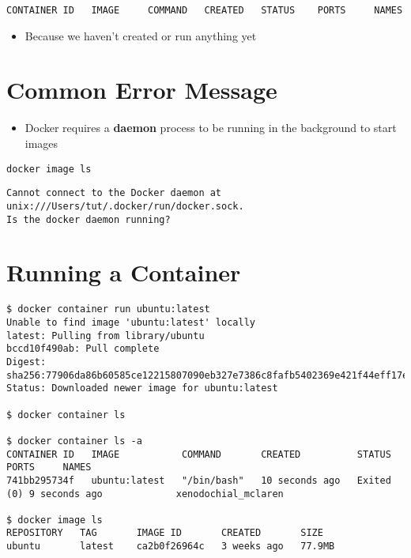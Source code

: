 \documentclass[krantzl]{krantz}
\newcommand{\glossref}[1]{\textbf{#1}}
\begin{document}
\begin{lstlisting}[frame=tblr,backgroundcolor=\color{black!5}]
CONTAINER ID   IMAGE     COMMAND   CREATED   STATUS    PORTS     NAMES
\end{lstlisting}

\begin{itemize}
\item Because we haven’t created or run anything yet

\end{itemize}
\section{Common Error Message}
\begin{itemize}
\item Docker requires a \glossref{daemon} process
    to be running in the background to start images

\end{itemize}
\begin{lstlisting}[frame=tblr]
docker image ls
\end{lstlisting}

\begin{lstlisting}[frame=tblr,backgroundcolor=\color{black!5}]
Cannot connect to the Docker daemon at unix:///Users/tut/.docker/run/docker.sock.
Is the docker daemon running?
\end{lstlisting}

\section{Running a Container}
\begin{lstlisting}[frame=tblr,backgroundcolor=\color{black!5}]
$ docker container run ubuntu:latest
Unable to find image 'ubuntu:latest' locally
latest: Pulling from library/ubuntu
bccd10f490ab: Pull complete
Digest: sha256:77906da86b60585ce12215807090eb327e7386c8fafb5402369e421f44eff17e
Status: Downloaded newer image for ubuntu:latest

$ docker container ls

$ docker container ls -a
CONTAINER ID   IMAGE           COMMAND       CREATED          STATUS                     PORTS     NAMES
741bb295734f   ubuntu:latest   "/bin/bash"   10 seconds ago   Exited (0) 9 seconds ago             xenodochial_mclaren

$ docker image ls
REPOSITORY   TAG       IMAGE ID       CREATED       SIZE
ubuntu       latest    ca2b0f26964c   3 weeks ago   77.9MB
\end{lstlisting}
\end{document}
